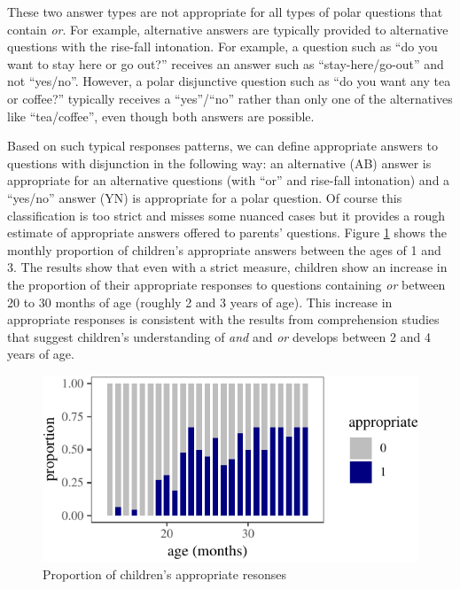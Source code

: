 \documentclass[floatsintext,man]{apa6}
\theoremstyle{definition}
\theoremstyle{definition}
\theoremstyle{definition}
\theoremstyle{remark}
\begin{document}
These two answer types are not appropriate for all types of polar
questions that contain \emph{or}. For example, alternative answers are
typically provided to alternative questions with the rise-fall
intonation. For example, a question such as \enquote{do you want to stay
here or go out?} receives an answer such as \enquote{stay-here/go-out}
and not \enquote{yes/no}. However, a polar disjunctive question such as
\enquote{do you want any tea or coffee?} typically receives a
\enquote{yes}/\enquote{no} rather than only one of the alternatives like
\enquote{tea/coffee}, even though both answers are possible.

Based on such typical responses patterns, we can define appropriate
answers to questions with disjunction in the following way: an
alternative (AB) answer is appropriate for an alternative questions
(with \enquote{or} and rise-fall intonation) and a \enquote{yes/no}
answer (YN) is appropriate for a polar question. Of course this
classification is too strict and misses some nuanced cases but it
provides a rough estimate of appropriate answers offered to parents'
questions. Figure \ref{fig:answerHitsPlot} shows the monthly proportion
of children's appropriate answers between the ages of 1 and 3. The
results show that even with a strict measure, children show an increase
in the proportion of their appropriate responses to questions containing
\emph{or} between 20 to 30 months of age (roughly 2 and 3 years of age).
This increase in appropriate responses is consistent with the results
from comprehension studies that suggest children's understanding of
\emph{and} and \emph{or} develops between 2 and 4 years of age.

\begin{figure}[tb]

{\centering \includegraphics{figs/answerHitsPlot-1} 

}

\caption{Proportion of children's appropriate resonses}\label{fig:answerHitsPlot}
\end{figure}
\end{document}

